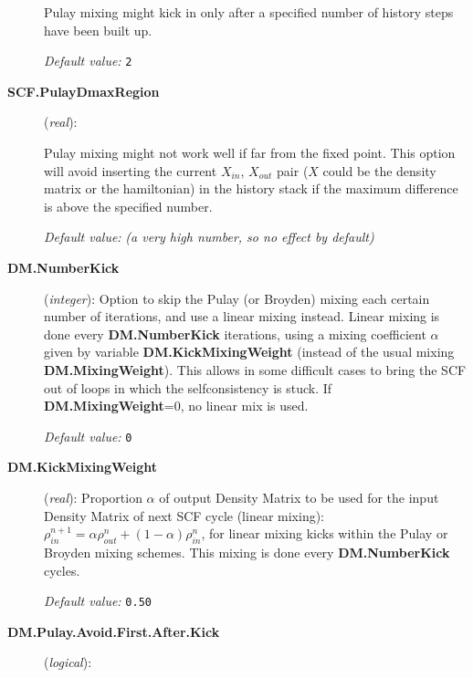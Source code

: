 \begin{description}
Pulay mixing might kick in only after a specified number of history
steps have been built up.

\textit{Default value:} \texttt{2}

\item[\textbf{SCF.PulayDmaxRegion}] (\textit{real}):

Pulay mixing might not work well if far from the fixed point. This option
will avoid inserting the current $X_{in}$, $X_{out}$ pair ($X$ could be
the density matrix or the hamiltonian) in the history stack if
the maximum difference is above the specified number.

\textit{Default value:} \textit{(a very high number, so no effect by
  default)}

\item[\textbf{DM.NumberKick}] (\textit{integer}):
Option to skip the Pulay (or Broyden) mixing each certain number of iterations,
and use a linear mixing instead. Linear mixing is done
every \textbf{DM.NumberKick} iterations, using a mixing coefficient
$\alpha$ given by variable \textbf{DM.KickMixingWeight}
(instead of the usual mixing \textbf{DM.MixingWeight}).
This allows in some difficult cases to bring the SCF out of
loops in which the selfconsistency is stuck.
If \textbf{DM.MixingWeight}=0, no linear mix is used.

\textit{Default value:} \texttt{0}

\item[\textbf{DM.KickMixingWeight}] (\textit{real}):
Proportion $\alpha$ of
output Density Matrix to be used for the input Density Matrix of
next SCF cycle (linear mixing):
$\rho^{n+1}_{in} = \alpha \rho^{n}_{out}
+(1 - \alpha) \rho^{n}_{in}$, for linear mixing kicks within the
Pulay or Broyden mixing schemes.
This mixing is done every \textbf{DM.NumberKick} cycles.

\textit{Default value:} \texttt{0.50}

\item[\textbf{DM.Pulay.Avoid.First.After.Kick}] (\textit{logical}):


\end{description}

